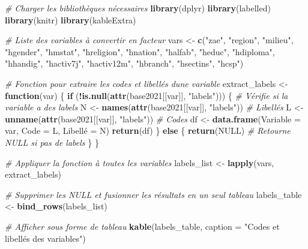 \documentclass[
]{article}
\newenvironment{Shaded}{\begin{snugshade}}{\end{snugshade}}
\newcommand{\AttributeTok}[1]{\textcolor[rgb]{0.13,0.29,0.53}{#1}}
\newcommand{\CommentTok}[1]{\textcolor[rgb]{0.56,0.35,0.01}{\textit{#1}}}
\newcommand{\ConstantTok}[1]{\textcolor[rgb]{0.56,0.35,0.01}{#1}}
\newcommand{\ControlFlowTok}[1]{\textcolor[rgb]{0.13,0.29,0.53}{\textbf{#1}}}
\newcommand{\FunctionTok}[1]{\textcolor[rgb]{0.13,0.29,0.53}{\textbf{#1}}}
\newcommand{\NormalTok}[1]{#1}
\newcommand{\OtherTok}[1]{\textcolor[rgb]{0.56,0.35,0.01}{#1}}
\newcommand{\SpecialCharTok}[1]{\textcolor[rgb]{0.81,0.36,0.00}{\textbf{#1}}}
\newcommand{\StringTok}[1]{\textcolor[rgb]{0.31,0.60,0.02}{#1}}
\begin{document}
\begin{Shaded}
\begin{Highlighting}[]
\CommentTok{\# Charger les bibliothèques nécessaires}
\FunctionTok{library}\NormalTok{(dplyr)}
\FunctionTok{library}\NormalTok{(labelled)}
\FunctionTok{library}\NormalTok{(knitr)}
\FunctionTok{library}\NormalTok{(kableExtra)}

\CommentTok{\# Liste des variables à convertir en facteur}
\NormalTok{vars }\OtherTok{\textless{}{-}} \FunctionTok{c}\NormalTok{(}\StringTok{"zae"}\NormalTok{, }\StringTok{"region"}\NormalTok{, }\StringTok{"milieu"}\NormalTok{, }\StringTok{"hgender"}\NormalTok{, }\StringTok{"hmstat"}\NormalTok{, }\StringTok{"hreligion"}\NormalTok{, }\StringTok{"hnation"}\NormalTok{,}
          \StringTok{"halfab"}\NormalTok{, }\StringTok{"heduc"}\NormalTok{, }\StringTok{"hdiploma"}\NormalTok{, }\StringTok{"hhandig"}\NormalTok{, }\StringTok{"hactiv7j"}\NormalTok{, }\StringTok{"hactiv12m"}\NormalTok{, }
          \StringTok{"hbranch"}\NormalTok{, }\StringTok{"hsectins"}\NormalTok{, }\StringTok{"hcsp"}\NormalTok{)}


\CommentTok{\# Fonction pour extraire les codes et libellés d\textquotesingle{}une variable}
\NormalTok{extract\_labels }\OtherTok{\textless{}{-}} \ControlFlowTok{function}\NormalTok{(var) \{}
  \ControlFlowTok{if}\NormalTok{ (}\SpecialCharTok{!}\FunctionTok{is.null}\NormalTok{(}\FunctionTok{attr}\NormalTok{(base2021[[var]], }\StringTok{"labels"}\NormalTok{))) \{  }\CommentTok{\# Vérifie si la variable a des labels}
\NormalTok{    N }\OtherTok{\textless{}{-}} \FunctionTok{names}\NormalTok{(}\FunctionTok{attr}\NormalTok{(base2021[[var]], }\StringTok{"labels"}\NormalTok{))  }\CommentTok{\# Libellés}
\NormalTok{    L }\OtherTok{\textless{}{-}} \FunctionTok{unname}\NormalTok{(}\FunctionTok{attr}\NormalTok{(base2021[[var]], }\StringTok{"labels"}\NormalTok{)) }\CommentTok{\# Codes}
\NormalTok{    df }\OtherTok{\textless{}{-}} \FunctionTok{data.frame}\NormalTok{(}\AttributeTok{Variable =}\NormalTok{ var, }\AttributeTok{Code =}\NormalTok{ L, Libellé }\OtherTok{=}\NormalTok{ N)}
    \FunctionTok{return}\NormalTok{(df)}
\NormalTok{  \} }\ControlFlowTok{else}\NormalTok{ \{}
    \FunctionTok{return}\NormalTok{(}\ConstantTok{NULL}\NormalTok{) }\CommentTok{\# Retourne NULL si pas de labels}
\NormalTok{  \}}
\NormalTok{\}}

\CommentTok{\# Appliquer la fonction à toutes les variables}
\NormalTok{labels\_list }\OtherTok{\textless{}{-}} \FunctionTok{lapply}\NormalTok{(vars, extract\_labels)}

\CommentTok{\# Supprimer les NULL et fusionner les résultats en un seul tableau}
\NormalTok{labels\_table }\OtherTok{\textless{}{-}} \FunctionTok{bind\_rows}\NormalTok{(labels\_list)}

\CommentTok{\# Afficher sous forme de tableau}
\FunctionTok{kable}\NormalTok{(labels\_table, }\AttributeTok{caption =} \StringTok{"Codes et libellés des variables"}\NormalTok{)}
\end{Highlighting}
\end{Shaded}
\end{document}

